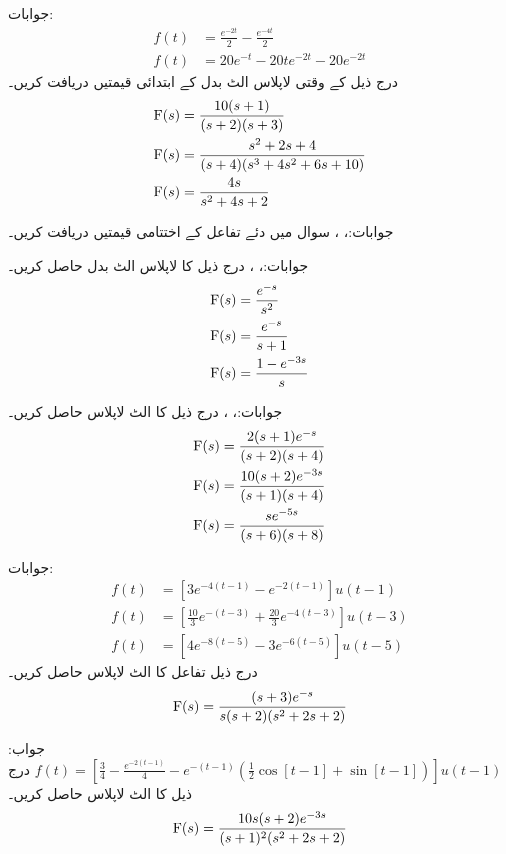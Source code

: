 جوابات:
\begin{align*}
f(t)&=\frac{e^{-2t}}{2}-\frac{e^{-4t}}{2}\\
f(t)&=20e^{-t}-20te^{-2t}-20e^{-2t}
\end{align*}
درج ذیل  کے وقتی لاپلاس الٹ بدل  کے ابتدائی قیمتیں دریافت کریں۔
\begin{align*}
{\ensuremath{{\textup{F}}}}(s)&=\frac{10(s+1)}{(s+2)(s+3)}\\
{{\textup{F}}}(s)&=\frac{s^2+2s+4}{(s+4)(s^3+4s^2+6s+10)}\\
{{\textup{F}}}(s)&=\frac{4s}{s^2+4s+2}
\end{align*}

جوابات:، ، 
سوال  میں دئے تفاعل کے اختتامی قیمتیں دریافت کریں۔

جوابات:، ، 
درج ذیل کا لاپلاس الٹ بدل حاصل کریں۔
\begin{align*}
{\ensuremath{{\textup{F}}}}(s)&=\frac{e^{-s}}{s^2}\\
{{\textup{F}}}(s)&=\frac{e^{-s}}{s+1}\\
{{\textup{F}}}(s)&=\frac{1-e^{-3s}}{s}
\end{align*}

جوابات:، ، 
درج ذیل کا الٹ لاپلاس حاصل کریں۔
\begin{align*}
{\ensuremath{{\textup{F}}}}(s)&=\frac{2(s+1)e^{-s}}{(s+2)(s+4)}\\
{{\textup{F}}}(s)&=\frac{10(s+2)e^{-3s}}{(s+1)(s+4)}\\
{{\textup{F}}}(s)&=\frac{se^{-5s}}{(s+6)(s+8)}
\end{align*}

جوابات:
\begin{align*}
f(t)&=\left[3e^{-4(t-1)}-e^{-2(t-1)}\right]u(t-1)\\
f(t)&=\left[\frac{10}{3}e^{-(t-3)}+\frac{20}{3}e^{-4(t-3)}\right]u(t-3)\\
f(t)&=\left[4e^{-8(t-5)}-3e^{-6(t-5)}\right]u(t-5)
\end{align*}
درج ذیل تفاعل کا الٹ لاپلاس حاصل کریں۔
\begin{align*}
{\ensuremath{{\textup{F}}}}(s)=\frac{(s+3)e^{-s}}{s(s+2)(s^2+2s+2)}
\end{align*}

جواب:
$f(t)=\left[\frac{3}{4}-\frac{e^{-2(t-1)}}{4}-e^{-(t-1)}\left(\frac{1}{2}\cos [t-1]+\sin [t-1]\right)\right]u(t-1)$
درج ذیل کا الٹ لاپلاس حاصل کریں۔
\begin{align*}
{\ensuremath{{\textup{F}}}}(s)=\frac{10s(s+2)e^{-3s}}{(s+1)^2(s^2+2s+2)}
\end{align*}

